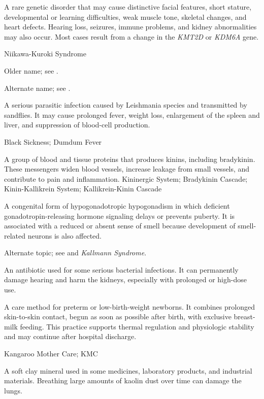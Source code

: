  A rare genetic disorder that may cause distinctive facial features, short stature, developmental or learning difficulties, weak muscle tone, skeletal changes, and heart defects. Hearing loss, seizures, immune problems, and kidney abnormalities may also occur. Most cases result from a change in the \textit{KMT2D} or \textit{KDM6A} gene.

\synonyms
Niikawa-Kuroki Syndrome

 Older name; see .

 Alternate name; see .

 A serious parasitic infection caused by Leishmania species and transmitted by sandflies. It may cause prolonged fever, weight loss, enlargement of the spleen and liver, and suppression of blood-cell production.

\synonyms
Black Sickness; Dumdum Fever

 A group of blood and tissue proteins that produces kinins, including bradykinin. These messengers widen blood vessels, increase leakage from small vessels, and contribute to pain and inflammation.
\synonyms
Kininergic System; Bradykinin Cascade; Kinin-Kallikrein System; Kallikrein-Kinin Cascade

 A congenital form of hypogonadotropic hypogonadism in which deficient gonadotropin-releasing hormone signaling delays or prevents puberty. It is associated with a reduced or absent sense of smell because development of smell-related neurons is also affected.

 Alternate topic; see  and \textit{Kallmann Syndrome}.

 An antibiotic used for some serious bacterial infections. It can permanently damage hearing and harm the kidneys, especially with prolonged or high-dose use.

 A care method for preterm or low-birth-weight newborns.
It combines prolonged skin-to-skin contact, begun as soon as possible after birth,
with exclusive breast-milk feeding. This practice supports thermal regulation and
physiologic stability and may continue after hospital discharge.

\synonyms
Kangaroo Mother Care; KMC

 A soft clay mineral used in some medicines, laboratory products, and industrial materials. Breathing large amounts of kaolin dust over time can damage the lungs.

